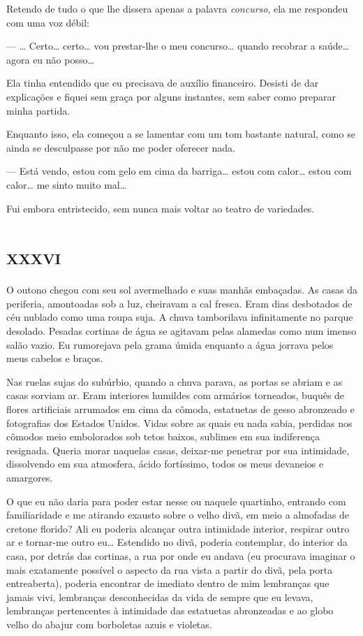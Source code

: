Retendo de tudo o que lhe dissera apenas a palavra \textit{concurso}, ela me respondeu com uma voz débil:

--- \ldots{} Certo\ldots{} certo\ldots{} vou prestar-lhe o meu concurso\ldots{} quando recobrar a saúde\ldots{} agora eu não posso\ldots{}

Ela tinha entendido que eu precisava de auxílio financeiro. Desisti de dar explicações e fiquei sem graça por alguns instantes, sem saber como preparar minha partida.

Enquanto isso, ela começou a se lamentar com um tom bastante natural, como se ainda se desculpasse por não me poder oferecer nada.

--- Está vendo, estou com gelo em cima da barriga\ldots{} estou com calor\ldots{} estou com calor\ldots{} me sinto muito mal\ldots{}

Fui embora entristecido, sem nunca mais voltar ao teatro de variedades.


\chapter*{\huge\centering\textsc{xxxvi}}

O outono chegou com seu sol avermelhado e suas manhãs embaçadas. As casas da periferia, amontoadas sob a luz, cheiravam a cal fresca. Eram dias desbotados de céu nublado como uma roupa suja. A chuva tamborilava infinitamente no parque desolado. Pesadas cortinas de água se agitavam pelas alamedas como num imenso salão vazio. Eu rumorejava pela grama úmida enquanto a água jorrava pelos meus cabelos e braços.

Nas ruelas sujas do subúrbio, quando a chuva parava, as portas se abriam e as casas sorviam ar. Eram interiores humildes com armários torneados, buquês de flores artificiais arrumados em cima da cômoda, estatuetas de gesso abronzeado e fotografias dos Estados Unidos. Vidas sobre as quais eu nada sabia, perdidas nos cômodos meio embolorados sob tetos baixos, sublimes em sua indiferença resignada.
Queria morar naquelas casas, deixar-me penetrar por sua intimidade, dissolvendo em sua atmosfera, ácido fortíssimo, todos os meus devaneios e amargores.

O que eu não daria para poder estar nesse ou naquele quartinho, entrando com familiaridade e me atirando exausto sobre o velho divã, em meio a almofadas de cretone florido? Ali eu poderia alcançar outra intimidade interior, respirar outro ar e tornar-me outro eu\ldots{} Estendido no divã, poderia contemplar, do interior da casa, por detrás das cortinas, a rua por onde eu andava (eu procurava imaginar o mais exatamente possível o aspecto da rua vista a partir do divã, pela porta entreaberta), poderia encontrar de imediato dentro de mim lembranças que jamais vivi, lembranças desconhecidas da vida de sempre que eu levava, lembranças pertencentes à intimidade das estatuetas abronzeadas e ao globo velho do abajur com borboletas azuis e violetas.

